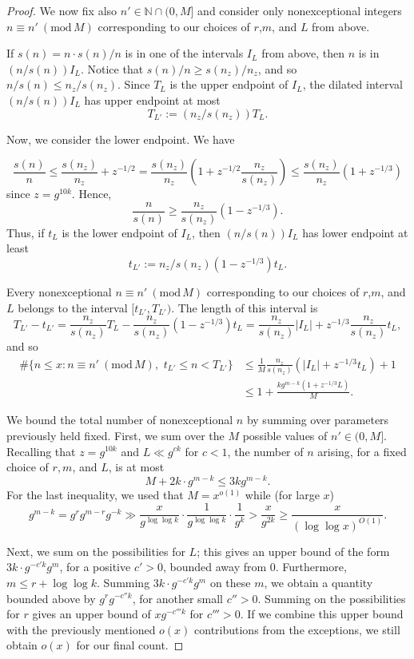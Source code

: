 \documentclass[11pt, reqno]{amsart}
\theoremstyle{remark}
\numberwithin{theorem}{section}
\numberwithin{proposition}{section}
\numberwithin{lemma}{section}
\numberwithin{corollary}{section}
\numberwithin{equation}{section}
\numberwithin{conjecture}{section}
\numberwithin{definition}{section}
\renewcommand{\bmod}[1]{\ ( \mathrm{mod} \, #1 )}
\begin{document}
\begin{proof}
We now fix also $n'\in \mathbb{N}\cap (0,M]$ and consider only nonexceptional integers $n \equiv n' \bmod M$ corresponding to our  choices of $r$,$m$, and $L$ from above.

If $s(n) = n \cdot s(n)/n$ is in one of the intervals $I_L$ from above, then $n$ is in $(n/s(n)) I_L$. Notice that $s(n)/n \geq s(n_z)/n_z$, and so
	$n/s(n)\leq  n_z/s(n_z)$. Since $T_L$ is the upper endpoint of $I_L$, the dilated interval $(n/s(n))I_L$ has upper endpoint at most \[ T_{L'} := (n_z/s(n_z)) T_L.\]
	
	Now, we consider the lower endpoint. We have
    
	$$\frac{s(n)}{n} \leq \frac{s(n_z)}{n_z}+ z^{-1/2}
	= \frac{s(n_z)}{n_z}\left(1 + z^{-1/2} \frac{n_z}{s(n_z)}\right)
\leq \frac{s(n_z)}{n_z} (1 + z^{-1/3})$$
since $z=g^{10k}.$ Hence,
 \[ \frac{n}{s(n)} \geq \frac{n_z}{s(n_z)} (1-z^{-1/3}).\] Thus, if $t_L$ is the lower endpoint of $I_L$, then $(n/s(n))I_L$ has lower endpoint at least \[ t_{L'} := n_z/s(n_z) (1-z^{-1/3}) t_L.\] 
 
Every nonexceptional $n\equiv n'\bmod{M}$ corresponding to our  choices of $r$,$m$,  and $L$ belongs to the interval $[t_{L'}, T_{L'})$. The length of this interval is
$$T_{L'}-t_{L'}=\frac{n_z}{s(n_z)} T_L-\frac{n_z}{s(n_z)}(1-z^{-1/3}) t_L=\frac{n_z}{s(n_z)} |I_L| + z^{-1/3} \frac{n_z}{s(n_z)} t_L,$$
and so
\begin{align*}
\#\{n\leq x: n \equiv n' \bmod M,\,\, t_{L'}\leq n< T_{L'}    \}&\leq \frac{1}{M}\frac{n_z}{s(n_z)} \left(|I_L| + z^{-1/3} t_L\right)+1
\\&\leq 1 + \frac{k g^{m-k}(1+z^{-1/3}L)}{M}.
\end{align*}

We bound the total number of nonexceptional $n$ by summing over parameters previously held fixed. First, we sum over the $M$ possible values of $n' \in (0,M]$. 
Recalling that $z=g^{10k}$ and $L\ll g^{ck}$ for $c<1$, the number of $n$ arising, for a fixed choice of $r, m$, and $L$, is at most
    \[ M + 2k \cdot g^{m-k} \le 3k g^{m-k}. \]
For the last inequality, we used that $M=x^{o(1)}$ while (for large $x$)
\[ g^{m-k} = g^{r} g^{m-r} g^{-k} \gg \frac{x}{g^{\log\log{k}}} \cdot \frac{1}{g^{\log\log{k}}} \cdot \frac{1}{g^k} > \frac{x}{g^{2k}} \ge \frac{x}{(\log\log{x})^{O(1)}}.\]
    
    
   
	
Next, we sum on the possibilities for $L$; this gives an upper bound of the form $3k \cdot g^{-c' k} g^m$, for a positive $c'>0$, bounded away from $0$. Furthermore, $m \leq r + \log \log k$. Summing $3k \cdot g^{-c' k} g^m$ on these $m$, we obtain a quantity bounded above by $g^r g^{-c'' k}$, for another small $c'' > 0$. Summing on the possibilities for $r$ gives an upper bound of $x g^{-c''' k}$ for $c'''>0$. If we combine this upper bound with the previously mentioned $o(x)$ contributions from the exceptions, we still obtain $o(x)$ for our final count.
		
	\end{proof}
\end{document}
